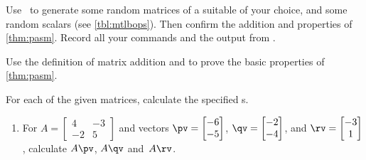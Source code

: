 \begin{exercise}  
Use \script\ to generate some random matrices of a suitable  of your choice, and some random scalars (see \cref{tbl:mtlbops}).
Then confirm the addition and  properties of \cref{thm:pasm}.
Record all your commands and the output from \script.
\end{exercise}


\begin{exercise}  
Use the definition of matrix addition and  to prove the basic properties of \cref{thm:pasm}. 
\end{exercise}







\begin{exercise} \label{ex:matvc} 
For each of the given matrices, calculate the specified s.
\begin{enumerate}
\item For \(A=\begin{bmatrix} 4&-3
\\-2&5 \end{bmatrix}\) and vectors 
\(\pv=\begin{bmatrix} -6\\-5 \end{bmatrix}\), 
\(\qv=\begin{bmatrix} -2\\-4 \end{bmatrix}\), and
\(\rv=\begin{bmatrix} -3\\1 \end{bmatrix}\), 
calculate  \(A\pv\), \(A\qv\) and~\(A\rv\).



\end{enumerate}
\end{exercise}
